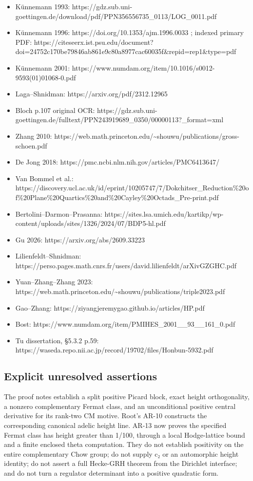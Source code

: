 \begin{itemize}
\tightlist
\item
  Künnemann 1993:
  https://gdz.sub.uni-goettingen.de/download/pdf/PPN356556735\_0113/LOG\_0011.pdf
\item
  Künnemann 1996: https://doi.org/10.1353/ajm.1996.0033 ; indexed
  primary PDF:
  https://citeseerx.ist.psu.edu/document?doi=24752c170be79846ab861e9c80a8977cac60035f\&repid=rep1\&type=pdf
\item
  Künnemann 2001:
  https://www.numdam.org/item/10.1016/s0012-9593(01)01068-0.pdf
\item
  Laga--Shnidman: https://arxiv.org/pdf/2312.12965
\item
  Bloch p.107 original OCR:
  https://gdz.sub.uni-goettingen.de/fulltext/PPN243919689\_0350/00000113?\_format=xml
\item
  Zhang 2010:
  https://web.math.princeton.edu/\textasciitilde shouwu/publications/gross-schoen.pdf
\item
  De Jong 2018: https://pmc.ncbi.nlm.nih.gov/articles/PMC6413647/
\item
  Van Bommel et al.:
  https://discovery.ucl.ac.uk/id/eprint/10205747/7/Dokchitser\_Reduction\%20of\%20Plane\%20Quartics\%20and\%20Cayley\%20Octads\_Pre-print.pdf
\item
  Bertolini--Darmon--Prasanna:
  https://sites.lsa.umich.edu/kartikp/wp-content/uploads/sites/1326/2024/07/BDP5-hl.pdf
\item
  Gu 2026: https://arxiv.org/abs/2609.33223
\item
  Lilienfeldt--Shnidman:
  https://perso.pages.math.cnrs.fr/users/david.lilienfeldt/arXivGZGHC.pdf
\item
  Yuan--Zhang--Zhang 2023:
  https://web.math.princeton.edu/\textasciitilde shouwu/publications/triple2023.pdf
\item
  Gao--Zhang: https://ziyangjeremygao.github.io/articles/HP.pdf
\item
  Bost: https://www.numdam.org/item/PMIHES\_2001\_\_93\_\_161\_0.pdf
\item
  Tu dissertation, §5.3.2 p.59:
  https://waseda.repo.nii.ac.jp/record/19702/files/Honbun-5932.pdf
\end{itemize}

\subsection{Explicit unresolved
assertions}\label{explicit-unresolved-assertions}

The proof notes establish a split positive Picard block, exact height
orthogonality, a nonzero complementary Fermat class, and an
unconditional positive central derivative for its rank-two CM motive.
Root's AR-10 constructs the corresponding canonical adelic height line.
AR-13 now proves the specified Fermat class has height greater than
1/100, through a local Hodge-lattice bound and a finite enclosed theta
computation. They do not establish positivity on the entire
complementary Chow group; do not supply c₂ or an automorphic height
identity; do not assert a full Hecke-GRH theorem from the Dirichlet
interface; and do not turn a regulator determinant into a positive
quadratic form.
